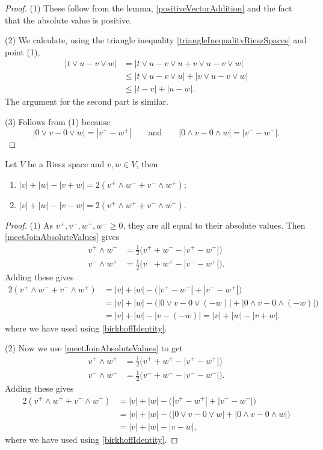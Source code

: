 \begin{proof}
(1) These follow from the lemma, \ref{positiveVectorAddition} and the fact that the absolute value is positive.

(2) We calculate, using the triangle inequality \ref{triangleInequalityRieszSpaces} and point (1),
\begin{align*}
|t\vee u - v\vee w| &= |t\vee u - v \vee u + v\vee u - v\vee w| \\
&\leq |t\vee u - v \vee u| + |v\vee u - v\vee w| \\
&\leq |t - v| + |u - w|.
\end{align*}
The argument for the second part is similar.

(3) Follows from (1) because
\[ |0\vee v - 0\vee w| = |v^+ -w^+| \qquad\text{and}\qquad |0\wedge v - 0\wedge w| = |v^- - w^-|. \]
\end{proof}

\begin{proposition} \label{offPerpendicularTerms}
Let $V$ be a Riesz space and $v,w\in V$, then
\begin{enumerate}
\item $|v| + |w| - |v+w| = 2(v^+\wedge w^- + v^-\wedge w^+)$;
\item $|v| + |w| - |v-w| = 2(v^+\wedge w^+ + v^-\wedge w^-)$.
\end{enumerate}
\end{proposition}
\begin{proof}
(1) As $v^+, v^-, w^+, w^- \geq 0$, they are all equal to their absolute values. Then \ref{meetJoinAbsoluteValues} gives
\begin{align*}
v^+\wedge w^- &= \frac{1}{2}\big(v^++w^- - |v^+-w^-|\big) \\
v^-\wedge w^+ &= \frac{1}{2}\big(v^-+w^+ - |v^--w^+|\big). 
\end{align*}
Adding these gives
\begin{align*}
2(v^+\wedge w^- + v^-\wedge w^+) &= |v| + |w| - \big(|v^+-w^-|+ |v^--w^+|\big) \\
&= |v| + |w| - \big(|0\vee v - 0\vee (-w)|+ |0\wedge v- 0\wedge (-w)|\big) \\
&= |v| + |w| - |v- (-w)| = |v| + |w| - |v + w|.
\end{align*}
where we have used using \ref{birkhoffIdentity}.

(2) Now we use \ref{meetJoinAbsoluteValues} to get
\begin{align*}
v^+\wedge w^+ &= \frac{1}{2}\big(v^++w^+ - |v^+-w^+|\big) \\
v^-\wedge w^- &= \frac{1}{2}\big(v^-+w^- - |v^--w^-|\big). 
\end{align*}
Adding these gives
\begin{align*}
2(v^+\wedge w^+ + v^-\wedge w^-) &= |v| + |w| - \big(|v^+-w^+|+ |v^--w^-|\big) \\
&= |v| + |w| - \big(|0\vee v - 0\vee w|+ |0\wedge v- 0\wedge w|\big) \\
&= |v| + |w| - |v- w|,
\end{align*}
where we have used using \ref{birkhoffIdentity}.
\end{proof}

